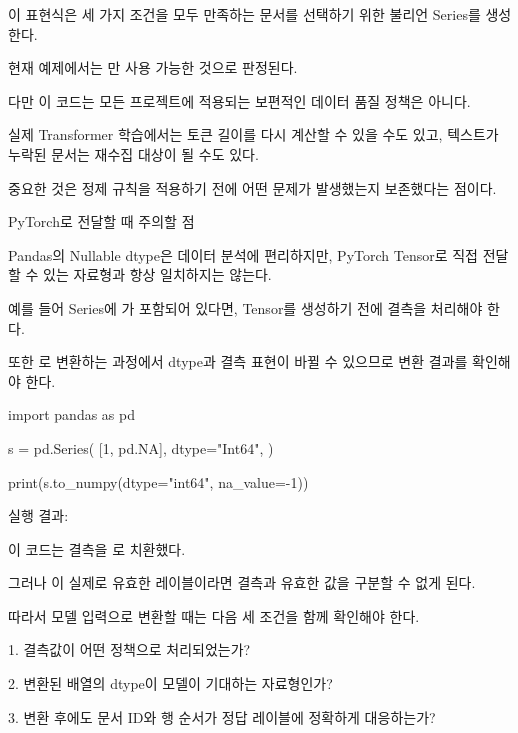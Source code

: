 이 표현식은 세 가지 조건을 모두 만족하는 문서를 선택하기 위한 불리언 Series를 생성한다.

현재 예제에서는 만 사용 가능한 것으로 판정된다.

다만 이 코드는 모든 프로젝트에 적용되는 보편적인 데이터 품질 정책은 아니다.

실제 Transformer 학습에서는 토큰 길이를 다시 계산할 수 있을 수도 있고, 텍스트가 누락된 문서는 재수집 대상이 될 수도 있다.

중요한 것은 정제 규칙을 적용하기 전에 어떤 문제가 발생했는지 보존했다는 점이다.

\begin{dhknote}
\begin{dhksmry}[centered]
PyTorch로 전달할 때 주의할 점
\end{dhksmry}
\end{dhknote}

Pandas의 Nullable dtype은 데이터 분석에 편리하지만, PyTorch Tensor로 직접 전달할 수 있는 자료형과 항상 일치하지는 않는다.

예를 들어  Series에 가 포함되어 있다면, Tensor를 생성하기 전에 결측을 처리해야 한다.

또한 로 변환하는 과정에서 dtype과 결측 표현이 바뀔 수 있으므로 변환 결과를 확인해야 한다.

\begin{dhkcode}
import pandas as pd

s = pd.Series(
    [1, pd.NA],
    dtype="Int64",
)

print(s.to_numpy(dtype="int64", na_value=-1))
\end{dhkcode}

실행 결과:

\begin{dhkzsh}
[ 1 -1]
\end{dhkzsh}

이 코드는 결측을 로 치환했다.

그러나 이 실제로 유효한 레이블이라면 결측과 유효한 값을 구분할 수 없게 된다.

따라서 모델 입력으로 변환할 때는 다음 세 조건을 함께 확인해야 한다.

\begin{dhksmry}
1. 결측값이 어떤 정책으로 처리되었는가?

2. 변환된 배열의 dtype이 모델이 기대하는 자료형인가?

3. 변환 후에도 문서 ID와 행 순서가 정답 레이블에 정확하게 대응하는가?
\end{dhksmry}

